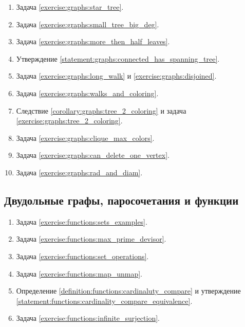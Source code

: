 \begin{enumerate}[label=\textbf{№\arabic*}:]
    \item Задача \ref{exercise:graphs:star_tree}.
    \item Задача \ref{exercise:graphs:small_tree_big_deg}.
    \item Задача \ref{exercise:graphs:more_then_half_leaves}.
    \item Утверждение \ref{statement:graphs:connected_has_spanning_tree}.
    \item Задача \ref{exercise:graphs:long_walk} и \ref{exercise:graphs:disjoined}.
    \item Задача \ref{exercise:graphs:walks_and_coloring}.
    \item Следствие \ref{corollary:graphs:tree_2_coloring} и задача \ref{exercise:graphs:tree_2_coloring}.
    \item Задача \ref{exercise:graphs:clique_max_colors}.
    \item Задача \ref{exercise:graphs:can_delete_one_vertex}.
    \item Задача \ref{exercise:graphs:rad_and_diam}.
\end{enumerate}

\subsection*{Двудольные графы, паросочетания и функции}

\begin{enumerate}[label=\textbf{№\arabic*}:]
    \item Задача \ref{exercise:functions:sets_examples}.
    \item Задача \ref{exercise:functions:max_prime_devisor}.
    \item Задача \ref{exercise:functions:set_operations}.
    \item Задача \ref{exercise:functions:map_unmap}.
    \item Определение \ref{definition:functions:cardinaluty_compare} и утверждение \ref{statement:functions:cardinality_compare_equivalence}.
    \item Задача \ref{exercise:functions:infinite_surjection}.
\end{enumerate}



